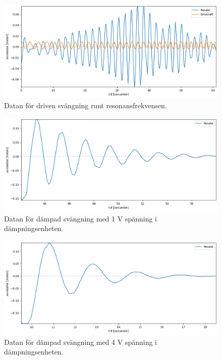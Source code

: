 \documentclass[12pt, a4paper]{article}
\begin{document}
\begin{figure}[hp]
    \includegraphics[width=\textwidth]{graf_resonansfrekvens}
    \caption{Datan för driven svängning runt resonansfrekvensen.}
    \label{fig:data_resonansfrekvens}
\end{figure}

\begin{figure}[hp]
    \includegraphics[width=\textwidth]{graf_1_v_centered.png}
    \caption{Datan för dämpad svängning med 1 V spänning i dämpningsenheten.}
    \label{fig:data_1_v}
\end{figure}

\begin{figure}[hp]
    \includegraphics[width=\textwidth]{graf_4_v_centered.png}
    \caption{Datan för dämpad svängning med 4 V spänning i dämpningsenheten.}
    \label{fig:data_4_v}
\end{figure}
\end{document}
